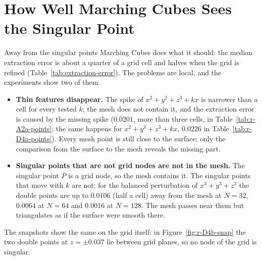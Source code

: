 \documentclass[12pt, a4paper]{article}
\theoremstyle{plain}
\theoremstyle{definition}
\theoremstyle{remark}
\theoremstyle{definition}
\begin{document}
\section{How Well Marching Cubes Sees the Singular Point}
\label{sec:r-accuracy}

Away from the singular points Marching Cubes \cite{lorensen1998marching,wenger2013} does what it should: the median
extraction error is about a quarter of a grid cell and halves when the grid is
refined (Table~\ref{tab:extraction-error}). The problems are local, and the
experiments show two of them.

\begin{itemize}
    \item \textbf{Thin features disappear.} The spike of $x^2+y^2+z^3+kx$ is
          narrower than a cell for every tested $k$; the mesh does not contain it,
          and the extraction error is caused by the missing spike ($0.0201$, more
          than three cells, in Table~\ref{tab:r-A2a-points}; the same happens for
          $x^2+y^3+z^3+kx$, $0.0226$ in Table~\ref{tab:r-D4a-points}). Every mesh point is still close to
          the surface; only the comparison from the surface to the mesh reveals the
          missing part.
    \item \textbf{Singular points that are not grid nodes are not in the mesh.} The
          singular point $P$ is a grid node, so the mesh contains it. The singular
          points that move with $k$ are not: for the balanced perturbation of
          $x^3+y^3+z^3$ the double points are up to $0.0106$ (half a cell) away from
          the mesh at $N=32$, $0.0064$ at $N=64$ and $0.0016$ at $N=128$. The mesh
          passes near them but triangulates as if the surface were smooth there.
\end{itemize}
The snapshots show the same on the grid itself: in Figure~\ref{fig:r-D4b-snap} the
two double points at $z=\pm0.037$ lie between grid planes, so no node of the grid is
singular.
\end{document}
